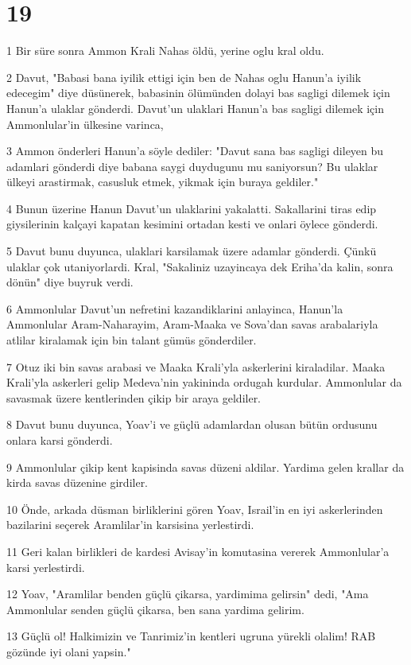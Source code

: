 \chapter{19}

\par 1 Bir süre sonra Ammon Krali Nahas öldü, yerine oglu kral oldu.
\par 2 Davut, "Babasi bana iyilik ettigi için ben de Nahas oglu Hanun'a iyilik edecegim" diye düsünerek, babasinin ölümünden dolayi bas sagligi dilemek için Hanun'a ulaklar gönderdi. Davut'un ulaklari Hanun'a bas sagligi dilemek için Ammonlular'in ülkesine varinca,
\par 3 Ammon önderleri Hanun'a söyle dediler: "Davut sana bas sagligi dileyen bu adamlari gönderdi diye babana saygi duydugunu mu saniyorsun? Bu ulaklar ülkeyi arastirmak, casusluk etmek, yikmak için buraya geldiler."
\par 4 Bunun üzerine Hanun Davut'un ulaklarini yakalatti. Sakallarini tiras edip giysilerinin kalçayi kapatan kesimini ortadan kesti ve onlari öylece gönderdi.
\par 5 Davut bunu duyunca, ulaklari karsilamak üzere adamlar gönderdi. Çünkü ulaklar çok utaniyorlardi. Kral, "Sakaliniz uzayincaya dek Eriha'da kalin, sonra dönün" diye buyruk verdi.
\par 6 Ammonlular Davut'un nefretini kazandiklarini anlayinca, Hanun'la Ammonlular Aram-Naharayim, Aram-Maaka ve Sova'dan savas arabalariyla atlilar kiralamak için bin talant gümüs gönderdiler.
\par 7 Otuz iki bin savas arabasi ve Maaka Krali'yla askerlerini kiraladilar. Maaka Krali'yla askerleri gelip Medeva'nin yakininda ordugah kurdular. Ammonlular da savasmak üzere kentlerinden çikip bir araya geldiler.
\par 8 Davut bunu duyunca, Yoav'i ve güçlü adamlardan olusan bütün ordusunu onlara karsi gönderdi.
\par 9 Ammonlular çikip kent kapisinda savas düzeni aldilar. Yardima gelen krallar da kirda savas düzenine girdiler.
\par 10 Önde, arkada düsman birliklerini gören Yoav, Israil'in en iyi askerlerinden bazilarini seçerek Aramlilar'in karsisina yerlestirdi.
\par 11 Geri kalan birlikleri de kardesi Avisay'in komutasina vererek Ammonlular'a karsi yerlestirdi.
\par 12 Yoav, "Aramlilar benden güçlü çikarsa, yardimima gelirsin" dedi, "Ama Ammonlular senden güçlü çikarsa, ben sana yardima gelirim.
\par 13 Güçlü ol! Halkimizin ve Tanrimiz'in kentleri ugruna yürekli olalim! RAB gözünde iyi olani yapsin."
